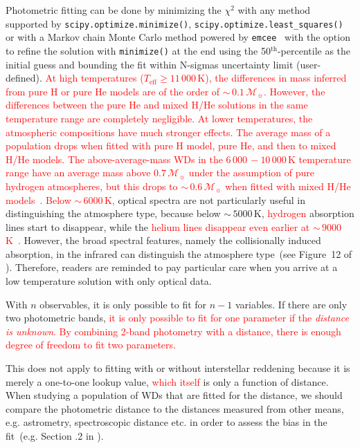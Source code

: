 \documentclass[fleqn,usenatbib]{rasti}
\newcommand{\msun}{\mathcal{M}_{\sun}}
\begin{document}
Photometric fitting can be done by minimizing the $\chi^2$ with any method
supported by \verb+scipy.optimize.minimize()+,
\verb+scipy.optimize.least_squares()+ or with a Markov chain Monte
Carlo method powered by \texttt{emcee}~\citep{2013PASP..125..306F} with the
option to refine the solution with \verb+minimize()+ at the end using the
50$^{\mathrm{th}}$-percentile as the initial guess and bounding the fit
within N-sigmas uncertainty limit (user-defined). \textcolor{red}{At high
temperatures ($T_{\mathrm{eff}} \geq 11\,000$\,K), the differences in mass
inferred from pure H or pure He models are of the order of
$\sim$\,$0.1\,\msun$. However, the differences between the pure He and mixed
H/He solutions in the same temperature range are completely negligible. At
lower temperatures, the atmospheric \textcolor{red}{compositions} have much
stronger effects. The average mass of a population drops when fitted with
pure H model, pure He, and then to mixed H/He models. The
\textcolor{red}{above-average-mass} WDs in the $6\,000\,-10\,000$\,K
temperature range \textcolor{red}{have} an average mass above $0.7\,\msun$
under the assumption of pure hydrogen atmospheres, but this drops to
$\sim$\,$0.6\,\msun$ when fitted with mixed
H/He models~\citep{2019ApJ...876...67B}. Below $\sim$\,$6000$\,K,} optical
spectra are not particularly useful in distinguishing the atmosphere
type, because below $\sim$\,$5000$\,K, \textcolor{red}{hydrogen} absorption
lines start to disappear, while the \textcolor{red}{helium lines disappear
even earlier at $\sim$\,$9000$\,K~\citep{2018ApJ...857...56R}.} However, the
broad spectral features, namely the collisionally induced absorption, in the
infrared can distinguish the atmosphere type~(see Figure~12 of
\citealt{2017ApJ...848...36B}). Therefore, readers are reminded to pay
particular care when you arrive at a low temperature solution with only
optical data.

With $n$ observables, it is only possible to fit for $n-1$ variables. If there
are only two photometric bands, \textcolor{red}{it is only possible to fit
for one parameter if the \textit{distance is unknown}. By combining 2-band
photometry with a distance, there is enough degree of freedom to fit two
parameters.}

This does not apply to fitting with or without interstellar reddening because
it is merely a one-to-one lookup value, \textcolor{red}{which itself} is
only a function of distance. When studying a population of WDs that are fitted
for the distance, we should compare the photometric distance to the distances
measured from other means, e.g. astrometry, spectroscopic distance etc. in order
to assess the bias in the fit~(e.g. Section .2
in \citealt{2011MNRAS.417...93R}).
\end{document}
